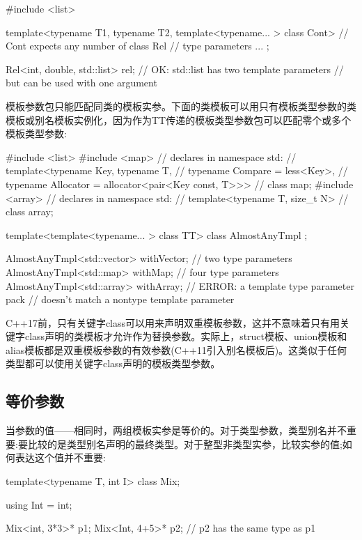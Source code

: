 \begin{cpp}
#include <list>

template<typename T1, typename T2,
		template<typename... > class Cont> // Cont expects any number of
class Rel { // type parameters
	...
};

Rel<int, double, std::list> rel; // OK: std::list has two template parameters
								// but can be used with one argument
\end{cpp}

模板参数包只能匹配同类的模板实参。下面的类模板可以用只有模板类型参数的类模板或别名模板实例化，因为作为TT传递的模板类型参数包可以匹配零个或多个模板类型参数:

\begin{cpp}
#include <list>
#include <map>
	// declares in namespace std:
	// template<typename Key, typename T,
	// typename Compare = less<Key>,
	// typename Allocator = allocator<pair<Key const, T>>>
	// class map;
#include <array>
	// declares in namespace std:
	// template<typename T, size_t N>
	// class array;
	
template<template<typename... > class TT>
class AlmostAnyTmpl {
};

AlmostAnyTmpl<std::vector> withVector; // two type parameters
AlmostAnyTmpl<std::map> withMap; // four type parameters
AlmostAnyTmpl<std::array> withArray; // ERROR: a template type parameter pack
									// doesn't match a nontype template parameter
\end{cpp}

C++17前，只有关键字class可以用来声明双重模板参数，这并不意味着只有用关键字class声明的类模板才允许作为替换参数。实际上，struct模板、union模板和alias模板都是双重模板参数的有效参数(C++11引入别名模板后)。这类似于任何类型都可以使用关键字class声明的模板类型参数。

\subsection{等价参数}

当参数的值——相同时，两组模板实参是等价的。对于类型参数，类型别名并不重要:要比较的是类型别名声明的最终类型。对于整型非类型实参，比较实参的值;如何表达这个值并不重要:

\begin{cpp}
template<typename T, int I>
class Mix;

using Int = int;

Mix<int, 3*3>* p1;
Mix<Int, 4+5>* p2; // p2 has the same type as p1
\end{cpp}

